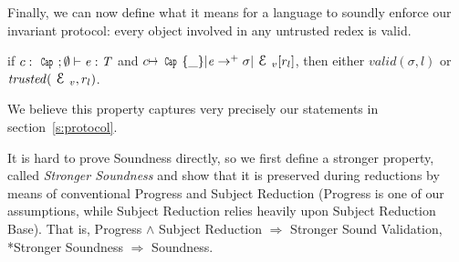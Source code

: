 \noindent Finally, we can now define what it means for a language to soundly enforce our invariant protocol: every object involved in any untrusted redex is valid.

\begin{theorem}[Soundness]
if $c:\Kw{Cap};\emptyset\vdash \e: \T$ and
$c\mapsto\Kw{Cap}\{\_\}|\e\rightarrow^+ \sigma|\ctx_v[r_l]$, then
either $valid(\sigma,l)$ or $\mathit{trusted}(\ctx_v,r_l)$.
\end{theorem}


We believe this property captures very precisely our statements in section~\ref{s:protocol}.

It is hard to prove Soundness directly,
so we first define a stronger property,
called \emph{Stronger Soundness} and
show that it is preserved during reductions by means of conventional
Progress and Subject Reduction (Progress is one of our assumptions,
while Subject Reduction relies heavily upon Subject Reduction Base).
That is,
Progress $\wedge$ Subject Reduction $\Rightarrow$ Stronger Sound Validation,
\\*Stronger Soundness $\Rightarrow$ Soundness.

